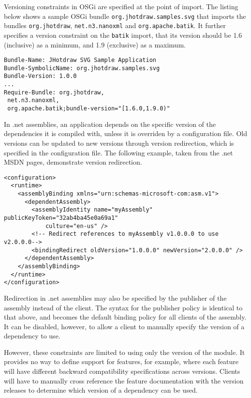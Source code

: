 Versioning constraints in OSGi are specified at the point of import. The
listing below shows a sample OSGi bundle \texttt{org.jhotdraw.samples.svg}
that imports the bundles \texttt{org.jhotdraw}, \texttt{net.n3.nanoxml} and
\texttt{org.apache.batik}. It further specifies a version constraint on
the \texttt{batik} import, that its version should be 1.6 (inclusive) as
a minimum, and 1.9 (exclusive) as a maximum.

\begin{lstlisting}[caption=OSGi Bundle Version Constraints]
Bundle-Name: JHotdraw SVG Sample Application
Bundle-SymbolicName: org.jhotdraw.samples.svg
Bundle-Version: 1.0.0
...
Require-Bundle: org.jhotdraw,
 net.n3.nanoxml,
 org.apache.batik;bundle-version="[1.6.0,1.9.0)"
\end{lstlisting}

In .net assemblies, an application depends on the specific version of the 
dependencies it is compiled with, unless it is overriden by a configuration
file. Old versions can be updated to new versions through version redirection,
which is specified in the configuration file. The following example, taken
from the .net MSDN pages, demonstrate version redirection.

\begin{lstlisting}[caption=.net Assemblies Version Redirection]
<configuration>
  <runtime>
    <assemblyBinding xmlns="urn:schemas-microsoft-com:asm.v1">
      <dependentAssembly>
        <assemblyIdentity name="myAssembly" publicKeyToken="32ab4ba45e0a69a1" 
        	culture="en-us" />
        <!-- Redirect references to myAssembly v1.0.0.0 to use v2.0.0.0-->
        <bindingRedirect oldVersion="1.0.0.0" newVersion="2.0.0.0" />
      </dependentAssembly>
    </assemblyBinding>
  </runtime>
</configuration>
\end{lstlisting}

Redirection in .net assemblies may also be specified by the publisher of the
assembly instead of the client. The syntax for the publisher policy is identical
to that above, and becomes the default binding policy for all clients of the assembly.
It can be disabled, however, to allow a client to manually specify the version of
a dependency to use.

However, these constraints are limited to using only the version of the module.
It provides no way to define support for features, for example, where each feature 
will have different backward compatibility specifications across versions. 
Clients will have to manually cross reference the feature documentation with the version releases
to determine which version of a dependency can be used.


